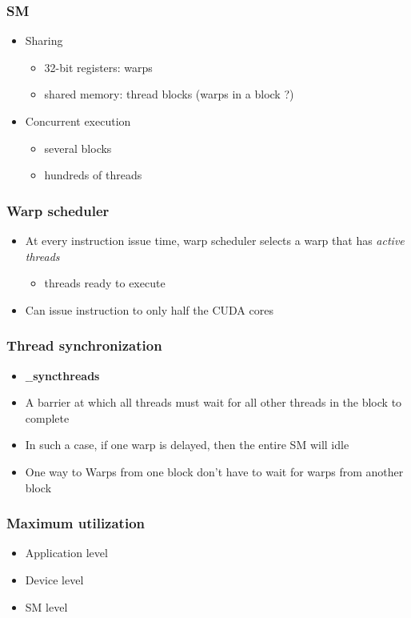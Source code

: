 \begin{frame}\frametitle{SM}\logoEvolution\mypagenum
	\begin{itemize}
		\item Sharing
			\begin{itemize}
				\item 32-bit registers: warps
				\item shared memory: thread blocks (warps in a block ?)
			\end{itemize}
		\item Concurrent execution
			\begin{itemize}
				\item several blocks
				\item hundreds of threads
			\end{itemize}
	\end{itemize}
\end{frame}
		


\begin{frame}\frametitle{Warp scheduler}
	\begin{itemize}
		\item At every instruction issue time, warp scheduler selects a warp that has \emph{active threads}
			\begin{itemize}
				\item threads ready to execute
			\end{itemize}
		\item Can issue instruction to only half the CUDA cores
	\end{itemize}
\end{frame}


\begin{frame}\frametitle{Thread synchronization}\logoEvolution\mypagenum
	\begin{itemize}
		\item $\_\_$\textbf{syncthreads}
		\item A barrier at which all threads must wait for all other threads in the block to complete
		\item In such a case, if one warp is delayed, then the entire SM will idle
		\item One way to Warps from one block don't have to wait for warps from another block
	\end{itemize}
\end{frame}


		
\begin{frame}\frametitle{Maximum utilization}\logoEvolution\mypagenum
	\begin{itemize}
		\item Application level
		\item Device level
		\item SM level
	\end{itemize}
\end{frame}




